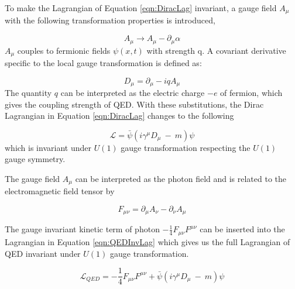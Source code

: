 To make the Lagrangian of Equation \ref{eqn:DiracLag} invariant, a gauge field $A_{\mu}$ with the following transformation properties is introduced, 

\begin{equation}
A_{\mu}\rightarrow A_{\mu} - \partial _{\mu} \alpha
\label{eqn:QEDGaugeField}
\end{equation}  
$A_{\mu}$ couples to fermionic fields $\psi(x,t)$ with strength q. A covariant derivative specific to the local gauge transformation is defined as:

\begin{equation}
D_{\mu} = \partial_{\mu} - iqA_{\mu}
\label{eqn:QEDCovDerv}
\end{equation}  
The quantity $q$ can be interpreted as the electric charge $-e$ of fermion, which gives the coupling strength of QED. With these substitutions, the Dirac Lagrangian in Equation \ref{eqn:DiracLag} changes to the following

\begin{equation}
\mathcal{L} = \bar{\psi} ( i \gamma^{\mu} D_{\mu} ~-~ m) \psi
\label{eqn:QEDInvLag}
\end{equation}
which is invariant under $U(1)$ gauge transformation respecting the $U(1)$ gauge symmetry. 

The gauge field $A_{\mu}$ can be interpreted as the photon field and is related to the electromagnetic field tensor by

\begin{equation}
F_{\mu\nu} = \partial_{\mu}A_{\nu} - \partial_{\nu}A_{\mu}
\label{QEDFieldTensor}
\end{equation}

The gauge invariant kinetic term of photon $-\frac{1}{4}F_{\mu\nu}F^{\mu\nu}$ can be inserted into the Lagrangian in Equation \ref{eqn:QEDInvLag} which gives us the full Lagrangian of QED invariant under $U(1)$ gauge transformation. 

\begin{equation}
\mathcal{L}_{QED} = -\frac{1}{4}F_{\mu\nu}F^{\mu\nu} + \bar{\psi} ( i \gamma^{\mu} D_{\mu} ~-~ m) \psi
\label{eqn:QEDFullLag}
\end{equation}

